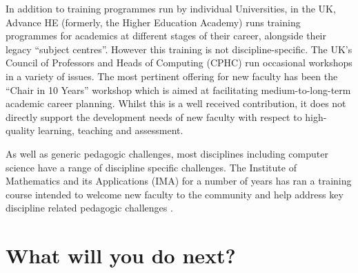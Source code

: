 \documentclass[sigconf]{acmart}
\begin{document}
In addition to training programmes run by individual Universities, in the UK, Advance HE (formerly, the Higher Education Academy) runs training programmes for academics at different stages of their career, alongside their legacy ``subject centres''. However this training is not discipline-specific. The UK's Council of Professors and Heads of Computing (CPHC) run occasional workshops in a variety of issues. The most pertinent offering for new faculty has been the ``Chair in 10 Years'' workshop which is aimed at facilitating medium-to-long-term academic career planning. Whilst this is a well received contribution, it does not directly support the development needs of new faculty with respect to high-quality learning, teaching and assessment.

As well as generic pedagogic challenges, most disciplines including computer science have a range of discipline specific challenges. The Institute of Mathematics and its Applications (IMA) for a number of years has ran a training course intended to welcome new faculty to the community and help address key discipline related pedagogic challenges \cite{IMA}.


\section{What will you do next?}
\end{document}
